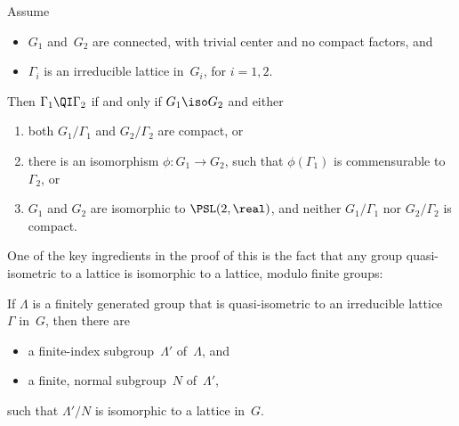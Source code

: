 \begin{thm} \label{QuasiMostowRig}
Assume
\noprelistbreak
	\begin{itemize}
	\item $G_1$ and~$G_2$ are connected, with trivial center and no compact factors,
	and
	\item $\Gamma_i$ is an irreducible lattice in~$G_i$, for $i = 1,2$.
	\end{itemize}
Then\/ $\Gamma_1 \QI \Gamma_2$ if and only if
$G_1 \iso G_2$ and either
 \begin{enumerate}
 \item both $G_1/\Gamma_1$ and $G_2/\Gamma_2$ are compact, or
 \item there is an isomorphism $\phi \colon G_1 \to G_2$,
such that $\phi(\Gamma_1)$ is commensurable
to\/~$\Gamma_2$, or
 \item $G_1$ and $G_2$ are isomorphic to\/ $\PSL(2,\real)$,
and neither $G_1/\Gamma_1$ nor $ G_2/\Gamma_2$ is compact.
 \end{enumerate}
 \end{thm}
 
One of the key ingredients in the proof of this  is the fact that any group quasi-isometric to a lattice is isomorphic to a lattice, modulo finite groups:

\begin{thm} \label{QItoLatt}
 If $\Lambda$ is a finitely generated group that is quasi-isometric to an irreducible lattice\/~$\Gamma$ in~$G$, then there are
 	\begin{itemize}
	\item a finite-index subgroup~$\Lambda'$ of~$\Lambda$,
	and
	\item a finite, normal subgroup~$N$ of~$\Lambda'$, 
	\end{itemize}
such that $\Lambda'/N$ is isomorphic to a lattice in~$G$.
 \end{thm}
 
